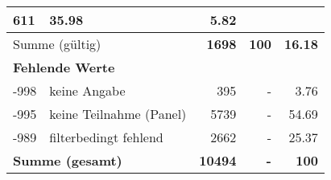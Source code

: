 \begin{longtable}{lXrrr}
       \num{611} &
       \num[round-mode=places,round-precision=2]{35.98} &
         \num[round-mode=places,round-precision=2]{5.82} \\
     \midrule
     \multicolumn{2}{l}{Summe (gültig)} &
       \textbf{\num{1698}} &
     \textbf{\num{100}} &
       \textbf{\num[round-mode=places,round-precision=2]{16.18}} \\
     \multicolumn{5}{l}{\textbf{Fehlende Werte}}\\
       -998 &
       keine Angabe &
         \num{395} &
        - &
         \num[round-mode=places,round-precision=2]{3.76} \\
       -995 &
       keine Teilnahme (Panel) &
         \num{5739} &
        - &
         \num[round-mode=places,round-precision=2]{54.69} \\
       -989 &
       filterbedingt fehlend &
         \num{2662} &
        - &
         \num[round-mode=places,round-precision=2]{25.37} \\
     \midrule
     \multicolumn{2}{l}{\textbf{Summe (gesamt)}} &
          \textbf{\num{10494}} &
        \textbf{-} &
        \textbf{\num{100}} \\
     \bottomrule
     \end{longtable}
     
